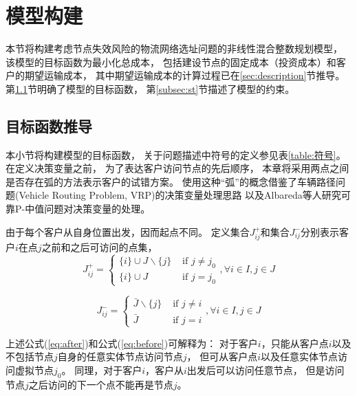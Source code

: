 \section{模型构建}
\label{sec:model}
本节将构建考虑节点失效风险的物流网络选址问题的非线性混合整数规划模型，
该模型的目标函数为最小化总成本，
包括建设节点的固定成本（投资成本）和客户的期望运输成本，
其中期望运输成本的计算过程已在\ref{sec:description}节推导。
第\ref{subsec:obj}节明确了模型的目标函数，
第\ref{subsec:st}节描述了模型的约束。

\subsection{目标函数推导}
\label{subsec:obj}
本小节将构建模型的目标函数，
关于问题描述中符号的定义参见表\ref{table:符号}。
在定义决策变量之前，
为了表达客户访问节点的先后顺序，
本章将采用两点之间是否存在弧的方法表示客户的试错方案。
使用这种``弧''的概念借鉴了车辆路径问题(Vehicle Routing Problem, VRP)的决策变量处理思路\cite{vigo}
以及Albareda等人\cite{rpmp}研究可靠P-中值问题对决策变量的处理。

由于每个客户从自身位置出发，因而起点不同。
定义集合$J_{ij}^+$和集合$J_{ij}^-$分别表示客户$i$在点$j$之前和之后可访问的点集，
\begin{equation}
    J_{ij}^+ =
    \begin{cases}
        \{i\} \cup J \backslash \{j\} & \text{ if } j \ne j_0\\
        \{i\} \cup J                  & \text{ if } j = j_0
    \end{cases},
    \forall i \in I, j\in J
    \label{eq:after}
\end{equation}

\begin{equation}
J_{ij}^- =
\begin{cases}
\bar{J} \backslash \{j\} & \text{ if } j \ne i\\
\bar{J}                  & \text{ if } j = i
\end{cases},
\forall i \in I, j\in J
\label{eq:before}
\end{equation}

上述公式(\ref{eq:after})和公式(\ref{eq:before})可解释为：
对于客户$i$，只能从客户点$i$以及不包括节点$j$自身的任意实体节点访问节点$j$，
但可从客户点$i$以及任意实体节点访问虚拟节点$j_0$。
同理，对于客户$i$，客户从$i$出发后可以访问任意节点，
但是访问节点$j$之后访问的下一个点不能再是节点$j$。

